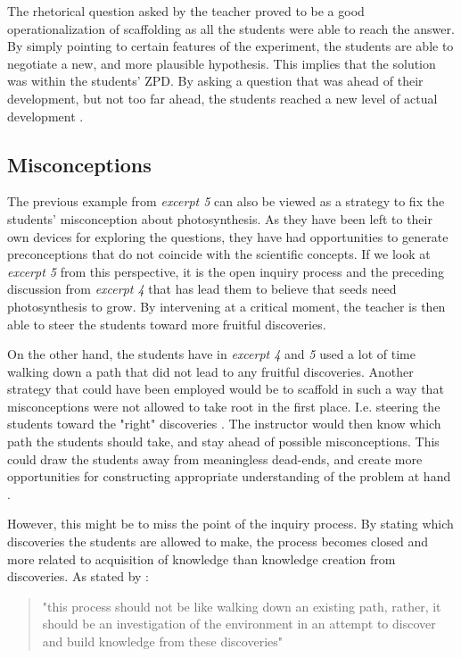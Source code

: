 The rhetorical question asked by the teacher proved to be a good operationalization of scaffolding as all the students were able to reach the answer. By simply pointing to certain features of the experiment, the students are able to negotiate a new, and more plausible hypothesis. This implies that the solution was within the students' ZPD. By asking a question that was ahead of their development, but not too far ahead, the students reached a new level of actual development  \citep{vygotskiui1978mind}.

\subsection{Misconceptions}
The previous example from \emph{excerpt 5} can also be viewed as a strategy to fix the students' misconception about photosynthesis. As they have been left to their own devices for exploring the questions, they have had opportunities to generate preconceptions that do not coincide with the scientific concepts. If we look at \emph{excerpt 5} from this perspective, it is the open inquiry process and the preceding discussion from \emph{excerpt 4} that has lead them to believe that seeds need photosynthesis to grow. By intervening at a critical moment, the teacher is then able to steer the students toward more fruitful discoveries. 

On the other hand, the students have in \emph{excerpt 4} and \emph{5} used a lot of time walking down a path that did not lead to any fruitful discoveries. Another strategy that could have been employed would be to scaffold in such a way that misconceptions were not allowed to take root in the first place. I.e. steering the students toward the "right" discoveries \citep{kluge2010simulation}. The instructor would then know which path the students should take, and stay ahead of possible misconceptions. This could draw the students away from meaningless dead-ends, and create more opportunities for constructing appropriate understanding of the problem at hand \citep{kluge2010simulation}.

However, this might be to miss the point of the inquiry process. By stating which discoveries the students are allowed to make, the process becomes closed and more related to acquisition of knowledge than knowledge creation from discoveries. As stated by \citeauthor{de1998scientific}: \begin{quote}"this process should not be like walking down an existing path, rather, it should be an investigation of the environment in an attempt to discover and build knowledge from these discoveries" \citetext{\citet{de1998scientific}, referenced in \citealp{kluge2010simulation}}
\end{quote}

